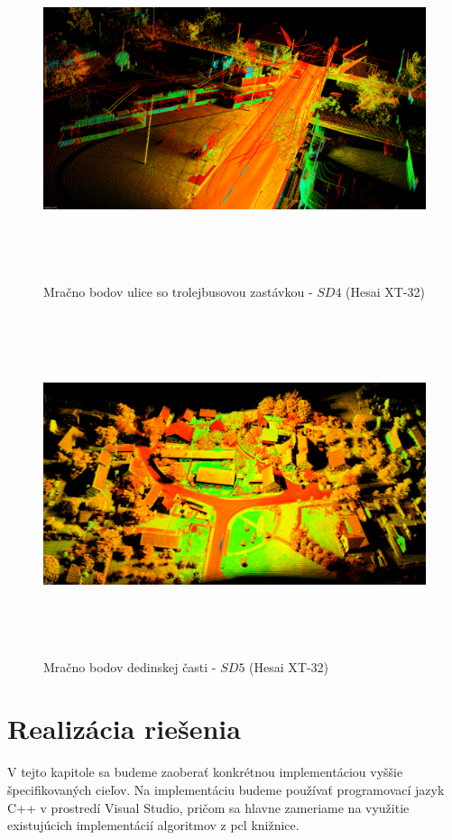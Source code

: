 \begin{figure}[!htbp]
  \centering
  \includegraphics[width=16cm, height=10cm]{img/SD4_example.png}
  \caption{Mračno bodov ulice so trolejbusovou zastávkou - $SD4$ (Hesai XT-32)} 
  \label{fig:SD4}
\end{figure} 

\begin{figure}[!htbp]
  \centering
  \includegraphics[width=16cm, height=10cm]{img/SD5_example.png}
  \caption{Mračno bodov dedinskej časti - $SD5$ (Hesai XT-32)} 
  \label{fig:SD5}
\end{figure} 

\section{Realizácia riešenia}
\noindent V tejto kapitole sa budeme zaoberať konkrétnou implementáciou vyššie špecifikovaných cieľov. Na implementáciu budeme používať programovací jazyk C++ v prostredí Visual Studio, pričom sa hlavne zameriame na využitie existujúcich implementácií algoritmov z \acrshort{pcl} knižnice.

